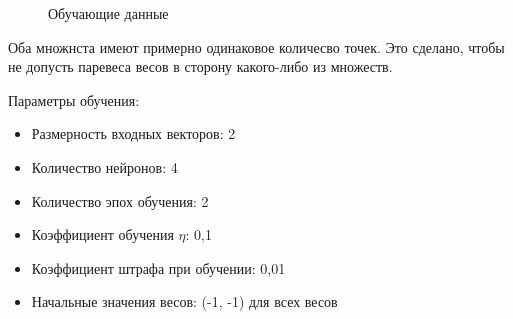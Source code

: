 

\begin{figure}[h]
    \begin{minipage}[h]{0.49\linewidth}
    \end{minipage}
    \hfill
    \begin{minipage}[h]{0.49\linewidth}
    \end{minipage}
    \caption{Обучающие данные}
    \label{img:points}
\end{figure}


Оба множнста имеют примерно одинаковое количесво точек. Это сделано, чтобы не допусть паревеса весов в сторону какого-либо из множеств.

Параметры обучения:
\begin{itemize}
    \item Размерность входных векторов: 2
    \item Количество нейронов: 4
    \item Количество эпох обучения: 2
    \item Коэффициент обучения $\eta$: 0,1
    \item Коэффициент штрафа при обучении: 0,01
    \item Начальные значения весов: (-1, -1) для всех весов
\end{itemize}

